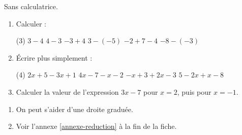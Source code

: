 \documentclass[10pt,a4paper]{article}
\begin{document}
\begin{bloc}
\begin{exo}
Sans calculatrice.
\begin{enumerate}[leftmargin=*]
    \item Calculer :
    \begin{tasks}(3)
        \task \(3-4\)
        \task \(4-3\)
        \task \(-3+4\)
        \task \(3-(-5)\)
        \task \(-2+7-4\)
        \task \(-8-(-3)\)
    \end{tasks}
    \item Écrire plus simplement :
    \begin{tasks}(4)
        \task \(2x+5-3x+1\)
        \task \(4x-7-x-2\)
        \task \(-x+3+2x-3\)
        \task \(5-2x+x-8\)
    \end{tasks}
    \item Calculer la valeur de l'expression \(3x-7\) pour \(x=2\), puis pour \(x=-1\).
\end{enumerate}
\end{exo}

\begin{indication}
    \begin{enumerate}
        \item On peut s'aider d'une droite graduée.
        \item Voir l'annexe \ref{annexe-reduction} à la fin de la fiche.
    \end{enumerate}
\end{indication}
\end{bloc}
\end{document}

